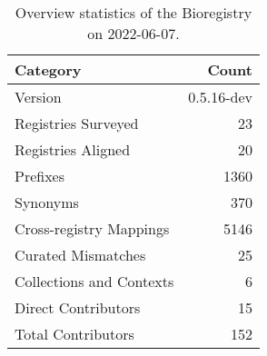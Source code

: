\begin{table}
\centering
\caption{Overview statistics of the Bioregistry on 2022-06-07.}
\label{tab:bioregistry-summary}
\begin{tabular}{lr}
\toprule
                Category &      Count \\
\midrule
                 Version & 0.5.16-dev \\
     Registries Surveyed &         23 \\
      Registries Aligned &         20 \\
                Prefixes &       1360 \\
                Synonyms &        370 \\
 Cross-registry Mappings &       5146 \\
      Curated Mismatches &         25 \\
Collections and Contexts &          6 \\
     Direct Contributors &         15 \\
      Total Contributors &        152 \\
\bottomrule
\end{tabular}
\end{table}
